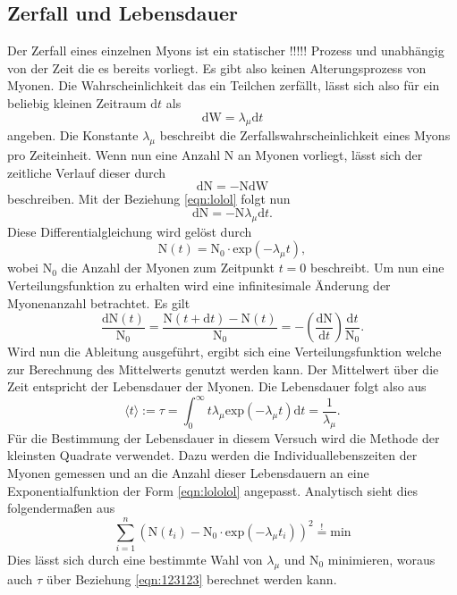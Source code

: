 \subsection{Zerfall und Lebensdauer}
Der Zerfall eines einzelnen Myons ist ein statischer !!!!! %
Prozess und unabhängig von der Zeit die es bereits vorliegt. Es gibt also keinen Alterungsprozess von Myonen.
Die Wahrscheinlichkeit das ein Teilchen zerfällt, lässt sich also für ein beliebig kleinen Zeitraum $\text{d}t$ als
\begin{equation}
    \label{eqn:lolol}
\text{dW} = \lambda_{\mu} \text{d}t
\end{equation}
angeben. Die Konstante $\lambda_{\mu}$ beschreibt die Zerfallswahrscheinlichkeit eines Myons pro Zeiteinheit.
Wenn nun eine Anzahl N an Myonen vorliegt, lässt sich der zeitliche Verlauf dieser durch
\begin{equation}
\text{dN} = - \text{N} \text{dW}
\end{equation}
beschreiben. Mit der Beziehung \ref{eqn:lolol} folgt nun
\begin{equation*}
\text{dN} = - \text{N} \lambda_{\mu} \text{d}t.
\end{equation*}
Diese Differentialgleichung wird gelöst durch 
\begin{equation}
    \label{eqn:lololol}
\text{N}(t) = \text{N}_0 \cdot \text{exp}(- \lambda_{\mu}t),
\end{equation}
wobei $\text{N}_0$ die Anzahl der Myonen zum Zeitpunkt $t=0$ beschreibt. Um nun eine Verteilungsfunktion zu erhalten wird eine infinitesimale
Änderung der Myonenanzahl betrachtet. Es gilt
\begin{equation}
\frac{\text{dN}(t)}{\text{N}_0} = \frac{\text{N}(t + \text{d}t) - \text{N}(t)}{\text{N}_0} = - \left(\frac{\text{dN}}{\text{d}t}\right)\frac{\text{d}t}{\text{N}_0}.
\end{equation}
Wird nun die Ableitung ausgeführt, ergibt sich eine Verteilungsfunktion welche zur Berechnung des Mittelwerts genutzt werden kann. Der Mittelwert über die Zeit 
entspricht der Lebensdauer der Myonen. Die Lebensdauer folgt also aus
\begin{equation}
    \label{eqn:123123}
    \langle t \rangle := \tau = \int_0^{\infty} t \lambda_{\mu} \text{exp}(- \lambda_{\mu} t) \text{d}t = \frac{1}{\lambda_{\mu}}.
\end{equation}
Für die Bestimmung der Lebensdauer in diesem Versuch wird die Methode der kleinsten Quadrate verwendet. Dazu werden die Individuallebenszeiten der Myonen gemessen und an 
die Anzahl dieser Lebensdauern an eine Exponentialfunktion der Form \ref{eqn:lololol} angepasst. 
Analytisch sieht dies folgendermaßen aus
\begin{equation}
\sum_{i=1}^{n} \left( \text{N}(t_i) - \text{N}_0 \cdot \text{exp}(- \lambda_{\mu}t_i)\right)^2 \stackrel{!}{=} \text{min}
\end{equation}
Dies lässt sich durch eine bestimmte Wahl von $\lambda_{\mu}$ und $\text{N}_0$ minimieren, woraus auch $\tau$ über Beziehung \ref{eqn:123123} berechnet werden kann.